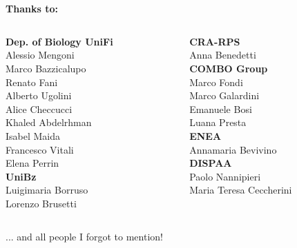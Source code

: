 \documentclass[10pt]{beamer}
\begin{document}

\section*{}
\begin{frame}
	\vspace{2mm}
	{\huge\textbf{Thanks to:}}
	\vspace{3mm}
	\begin{columns}[T]
		\begin{column}{0.5\textwidth}
			{\large\textbf{Dep. of Biology UniFi}}\\
			Alessio Mengoni\\
			Marco Bazzicalupo\\
			Renato Fani\\
			Alberto Ugolini\\
			Alice Checcucci\\
			Khaled Abdelrhman\\ 
			Isabel Maida\\			
			Francesco Vitali	\\
			Elena Perrin\\
			\vspace{2mm}
			{\large\textbf{UniBz}}\\
			Luigimaria Borruso\\
			Lorenzo Brusetti\\			
		\end{column}
		\begin{column}{0.5\textwidth}
			{\large\textbf{CRA-RPS}}\\
			Anna Benedetti\\
			\vspace{2mm}
			{\large\textbf{COMBO Group}}\\
			Marco Fondi\\
			Marco Galardini\\
			Emanuele Bosi\\
			Luana Presta\\				
			\vspace{2mm}
			{\large\textbf{ENEA}}\\
			Annamaria Bevivino\\
			\vspace{2mm}
			{\large\textbf{DISPAA}}\\			
			Paolo Nannipieri\\
			Maria Teresa Ceccherini\\
		\end{column}
	\end{columns}
	\vspace{8mm}
	\let\thefootnote\relax\large{... and all people I forgot to mention!}
\end{frame}
\end{document}
